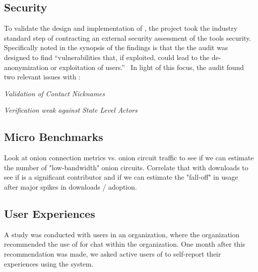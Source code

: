 \subsection{Security}

To validate the design and implementation of \systemname, the project took the
industry standard step of contracting an external security assessment of the
tools security. Specifically noted in the synopsis of the findings is that
the the audit was designed to find ``vulnerabilities that, if exploited,
could lead to the de-anonymization or exploitation of \systemname users.''~\cite{securityAudit}
In light of this focus, the audit found two relevant issues with \systemname:

\textit{Validation of Contact Nicknames}

\textit{Verification weak against State Level Actors}

\subsection{Micro Benchmarks}

Look at onion connection metrics vs. onion circuit traffic to see if we can
estimate the number of "low-bandwidth" onion circuits. Correlate that with
downloads to see if \systemname is a significant contributor and if we can
estimate the "fall-off" in usage after major spikes in downloads / adoption.


\subsection{User Experiences}

A study was conducted with  users in an organization, where the
organization recommended the use of \systemname for chat within the
organization. One month after this recommendation was made, we asked active
users of \systemname to self-report their experiences using the system.



